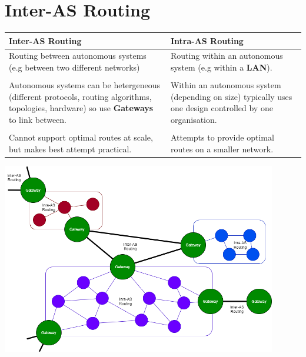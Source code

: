 \section{Inter-AS Routing}
\begin{center}
    \begin{tabular}{p{} | p{}}
        \textbf{Inter-AS Routing}                                                 & \textbf{Intra-AS Routing}                                                                                 \\
        \hline
        Routing between autonomous systems (e.g between two different networks)   & Routing within an autonomous system (e.g within a \textbf{LAN}).                                          \\
        \\
        Autonomous systems can be hetergeneous (different protocols, routing algorithms, topologies, hardware) so use \textbf{Gateways} to link between.
                                                                                  & Within an autonomous system (depending on size) typically uses one design controlled by one organisation. \\
        \\
        Cannot support optimal routes at scale, but makes best attempt practical. & Attempts to provide optimal routes on a smaller network.                                                  \\
    \end{tabular}
\end{center}
\begin{center}\includegraphics[width=0.9\textwidth]{network_layer/images/intra-as routing}\end{center}
